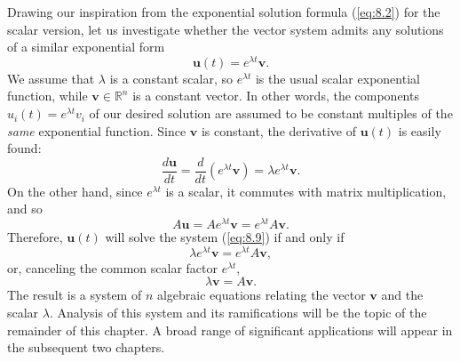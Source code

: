 \documentclass[12pt]{article}
\theoremstyle{remark}
\begin{document}
Drawing our inspiration from the exponential solution formula (\ref{eq:8.2}) for the scalar version, let us investigate whether the vector system admits any solutions of a similar exponential form
\begin{equation}
    \mathbf{u}(t)=e^{\lambda t}\mathbf{v}.
    \label{eq:8.11}
\end{equation}
We assume that $\lambda$ is a constant scalar, so $e^{\lambda t}$ is the usual scalar exponential function, while $\mathbf{v}\in\mathbb{R}^n$ is a constant vector. In other words, the components $u_i(t)=e^{\lambda t}v_i$ of our desired solution are assumed to be constant multiples of the \emph{same} exponential function. Since $\mathbf{v}$ is constant, the derivative of $\mathbf{u}(t)$ is easily found:
\begin{equation*}
    \frac{d\mathbf{u}}{dt} = \frac{d}{dt}\left(e^{\lambda t}\mathbf{v}\right) = \lambda e^{\lambda t}\mathbf{v}.
\end{equation*}
On the other hand, since $e^{\lambda t}$ is a scalar, it commutes with matrix multiplication, and so
\begin{equation*}
    A\mathbf{u} = Ae^{\lambda t}\mathbf{v}=e^{\lambda t}A\mathbf{v}.
\end{equation*}
Therefore, $\mathbf{u}(t)$ will solve the system (\ref{eq:8.9}) if and only if
\begin{equation*}
    \lambda e^{\lambda t}\mathbf{v} = e^{\lambda t}A\mathbf{v},
\end{equation*}
or, canceling the common scalar factor $e^{\lambda t}$,
\begin{equation*}
    \lambda \mathbf{v} = A\mathbf{v}.
\end{equation*}
The result is a system of $n$ algebraic equations relating the vector $\mathbf{v}$ and the scalar $\lambda$. Analysis of this system and its ramifications will be the topic of the remainder of this chapter. A broad range of significant applications will appear in the subsequent two chapters.
\end{document}
